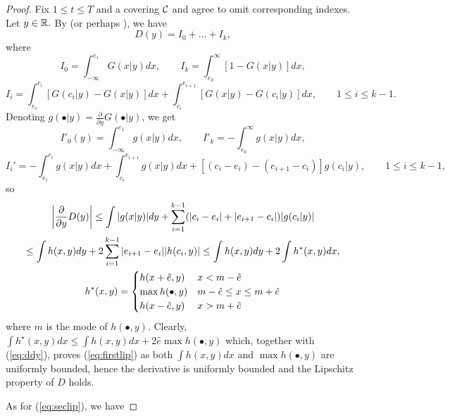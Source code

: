 \documentclass{article}              %
\begin{document}
\begin{proof}
Fix $1\leq t\leq T$ and a covering $\mathcal{C}$ and agree to omit corresponding
indexes. Let $y\in\mathbb{R}.$ By \cite{Vallander73} (or perhaps \cite{Pflug01}), we have
\[
D(y)=I_{0}+\dots+I_{k},
\]
where
\[
I_{0}=\int_{-\infty}^{e_{1}}G(x|y)dx,\qquad I_{k}=\int_{e_{k}}^{\infty}[1-G(x|y)]dx,
\]
\[
I_{i}=\int_{e_{i}}^{c_{i}}[G(c_{i}|y)-G(x|y)]dx+\int_{c_{i}}^{e_{i+1}}[G(x|y)-G(c_{i}|y)]dx,
\qquad 1\leq i\leq k-1.
\]
Denoting $g(\bullet|y)=\frac{\partial}{\partial y}G(\bullet|y)$,
we get
\[
I'_{0}(y)=\int_{-\infty}^{e_{1}}g(x|y)dx,\qquad I'_{k}=-\int_{e_{k}}^{\infty}g(x|y)dx,
\]
\[
I_{i}'=-\int_{e_{i}}^{c_{i}}g(x|y)dx+\int_{c_{i}}^{e_{i+1}}g(x|y)dx+[(c_{i}-e_{i})-(e_{i+1}-c_{i})]g(c_{i}|y),\qquad 
1\leq i\leq k-1,
\]
so
\begin{multline}
\left|\frac{\partial}{\partial y}D(y)\right|\leq\text{\ensuremath{\int|g(x|y)|dy+
\sum_{i=1}^{k-1}(|c_{i}-e_{i}|+|e_{i+1}-c_{i}|)}}|g(c_{i}|y)|\\
\leq\int h(x,y)dy+2\sum_{i=1}^{k-1}|e_{i+1}-e_{i}||h(c_{i},y)|\leq\int h(x,y)dy+2\int h^{*}(x,y)dx,\\
h^{*}(x,y)=\begin{cases}
h(x+\hat e,y) & x<m-\hat{e}\\
\max h(\bullet,y) & m-\hat{e}\leq x\leq m+\hat{e}\\
h(x-\hat{e},y) & x>m+\hat{e}
\end{cases}\label{eq:ddy}
\end{multline}
where $m$ is the mode of $h(\bullet,y)$. Clearly, $\int h^{\star}(x,y)dx\leq\int h(x,y)dx+2\hat{e}\max h(\bullet,y)$
which, together with (\ref{eq:ddy}), proves (\ref{eq:firstlip})
as both $\int h(x,y)dx$ and $\max h(\bullet,y)$ are uniformly bounded, hence
the derivative is uniformly bounded and the Lipschitz property of $D$ holds. 

As for (\ref{eq:seclip}), we have


\end{proof}
\end{document}
